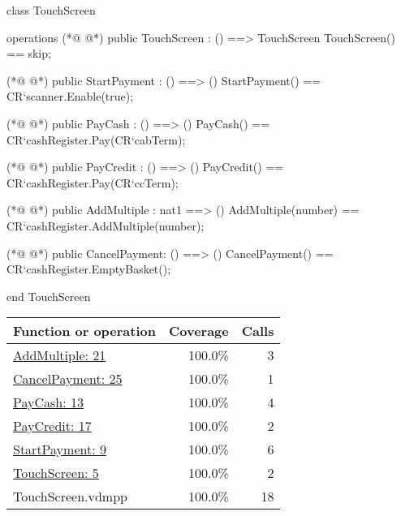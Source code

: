 \begin{vdmpp}
class TouchScreen


operations
(*@
\label{TouchScreen:5}
@*)
 public TouchScreen : () ==> TouchScreen
 TouchScreen() ==
  skip;

(*@
\label{StartPayment:9}
@*)
 public StartPayment : () ==> ()
 StartPayment() ==
  CR`scanner.Enable(true);

(*@
\label{PayCash:13}
@*)
 public PayCash : () ==> ()
 PayCash() ==
  CR`cashRegister.Pay(CR`cabTerm);

(*@
\label{PayCredit:17}
@*)
 public PayCredit : () ==> ()
 PayCredit() ==
  CR`cashRegister.Pay(CR`ccTerm);
  
(*@
\label{AddMultiple:21}
@*)
 public AddMultiple : nat1 ==> ()
 AddMultiple(number) == 
  CR`cashRegister.AddMultiple(number);
 
(*@
\label{CancelPayment:25}
@*)
 public CancelPayment: () ==> ()
 CancelPayment() == 
  CR`cashRegister.EmptyBasket();
  
end TouchScreen
\end{vdmpp}
\bigskip
\begin{longtable}{|l|r|r|}
\hline
Function or operation & Coverage & Calls \\
\hline
\hline
\hyperref[AddMultiple:21]{AddMultiple: 21} & 100.0\% & 3 \\
\hline
\hyperref[CancelPayment:25]{CancelPayment: 25} & 100.0\% & 1 \\
\hline
\hyperref[PayCash:13]{PayCash: 13} & 100.0\% & 4 \\
\hline
\hyperref[PayCredit:17]{PayCredit: 17} & 100.0\% & 2 \\
\hline
\hyperref[StartPayment:9]{StartPayment: 9} & 100.0\% & 6 \\
\hline
\hyperref[TouchScreen:5]{TouchScreen: 5} & 100.0\% & 2 \\
\hline
\hline
TouchScreen.vdmpp & 100.0\% & 18 \\
\hline
\end{longtable}

